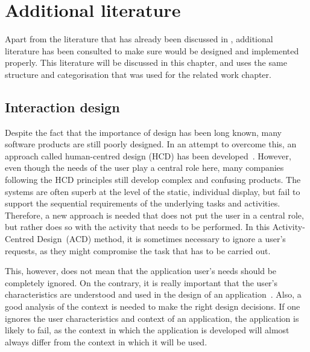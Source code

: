 \chapter{Additional literature}

Apart from the literature that has already been discussed in , additional literature has been consulted to make sure \oframp{} would be designed and implemented properly. This literature will be discussed in this chapter, and uses the same structure and categorisation that was used for the related work chapter.



\section{Interaction design}
Despite the fact that the importance of design has been long known, many software products are still poorly designed. In an attempt to overcome this, an approach called human-centred design (HCD) has been developed~\cite{norman2005human}. However, even though the needs of the user play a central role here, many companies following the HCD principles still develop complex and confusing products. The systems are often superb at the level of the static, individual display, but fail to support the sequential requirements of the underlying tasks and activities. Therefore, a new approach is needed that does not put the user in a central role, but rather does so with the activity that needs to be performed. In this Activity-Centred Design~(ACD) method, it is sometimes necessary to ignore a user's requests, as they might compromise the task that has to be carried out.

This, however, does not mean that the application user's needs should be completely ignored. On the contrary, it is really important that the user's characteristics are understood and used in the design of an application~\cite{badre2002shaping}. Also, a good analysis of the context is needed to make the right design decisions. If one ignores the user characteristics and context of an application, the application is  likely to fail, as the context in which the application is developed will almost always differ from the context in which it will be used.


